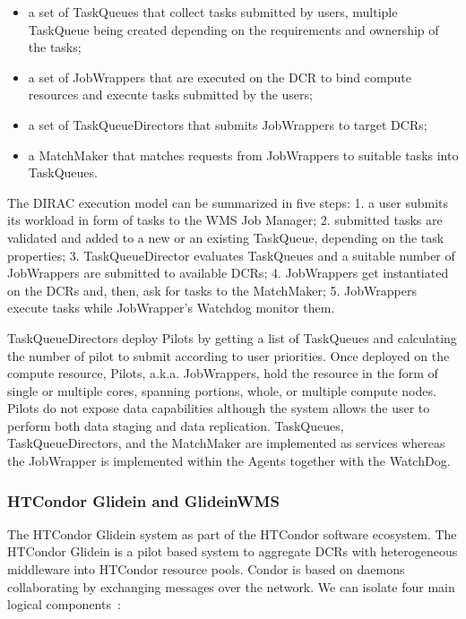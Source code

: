 \begin{itemize}
    \item a set of TaskQueues that collect tasks submitted by users, multiple
    TaskQueue being created depending on the requirements and ownership of the
    tasks;
    \item a set of JobWrappers that are executed on the DCR to bind compute
    resources and execute tasks submitted by the users;
    \item a set of TaskQueueDirectors that submits JobWrappers to target DCRs;
    \item a MatchMaker that matches requests from JobWrappers to suitable tasks
    into TaskQueues.
\end{itemize}

The DIRAC execution model can be summarized in five steps: 1. a user submits its
workload in form of tasks to the WMS Job Manager; 2. submitted tasks are
validated and added to a new or an existing TaskQueue, depending on the task
properties; 3. TaskQueueDirector evaluates TaskQueues and a suitable number of
JobWrappers are submitted to available DCRs; 4. JobWrappers get instantiated on
the DCRs and, then, ask for tasks to the MatchMaker; 5. JobWrappers execute
tasks while JobWrapper’s Watchdog monitor them.

TaskQueueDirectors deploy Pilots by getting a list of TaskQueues and calculating
the number of pilot to submit according to user priorities. Once deployed on the
compute resource, Pilots, a.k.a. JobWrappers, hold the resource in the form of
single or multiple cores, spanning portions, whole, or multiple compute nodes.
Pilots do not expose data capabilities although the system allows the user to
perform both data staging and data replication. TaskQueues, TaskQueueDirectors,
and the MatchMaker are implemented as services whereas the JobWrapper is
implemented within the Agents together with the WatchDog.


\subsubsection{HTCondor Glidein and GlideinWMS}

The HTCondor Glidein system as part of the HTCondor software ecosystem. The
HTCondor Glidein is a pilot based system to aggregate DCRs with heterogeneous
middleware into HTCondor resource pools. Condor is based on daemons
collaborating by exchanging messages over the network. We can isolate four main
logical components~\cite{Sfiligoi2008}:

